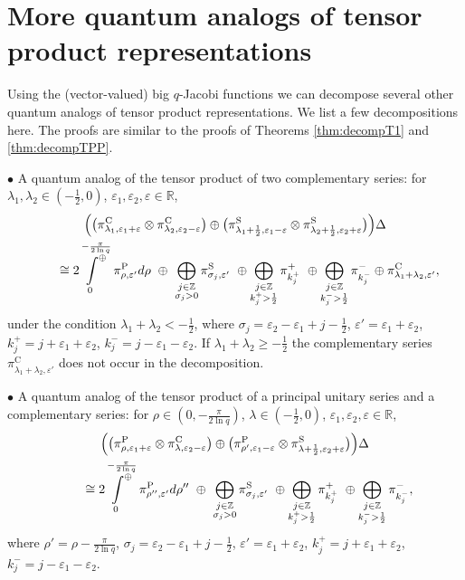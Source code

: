 \documentclass[pdftex]{sigma}
\numberwithin{equation}{section}
\numberwithin{theorem}{section}
\numberwithin{proposition}{section}
\numberwithin{lemma}{section}
\numberwithin{corollary}{section}
\numberwithin{definition}{section}
\numberwithin{example}{section}
\numberwithin{remark}{section}
\numberwithin{note}{section}
\newcommand{\R}{\mathbb R}
\newcommand{\Z}{\mathbb Z}
\newcommand{\eps}{\varepsilon}
\newcommand{\dirint}[2]{\sideset{}{^\oplus}\int\limits_{#1\ }^{\ \ #2}}
\begin{document}

\section{More quantum analogs of tensor product representations} \label{sec:more}
Using the (vector-valued) big $q$-Jacobi functions we can decompose several other quantum analogs of tensor product representations. We list a few decompositions here. The proofs are similar to the proofs of Theorems \ref{thm:decompT1} and \ref{thm:decompTPP}.


$\bullet$ A quantum analog of the tensor product of two complementary series:
for $\lambda_1,\lambda_2 \in (-\frac12,0)$, $\eps_1,\eps_2, \eps \in \R$,
\begin{gather*}
\Big(\big(\pi_{\lambda_1,\eps_1+\eps}^{\mathrm{C}}  \otimes \pi_{\lambda_2,\eps_2-\eps}^{\mathrm{C}}\big) \oplus \big(\pi_{\lambda_1+\frac12,\eps_1-\eps}^{\mathrm{S}} \otimes \pi_{\lambda_2+\frac12,\eps_2+\eps}^{\mathrm{S}}\big)\Big)\Delta
 \\
\qquad{} \cong 2\dirint{0}{-\frac{\pi}{2 \ln q}} \pi^{\mathrm P}_{\rho,\eps'} d\rho\ \oplus\ \bigoplus_{\substack{j\in\Z\\ \sigma_j>0}} \pi_{\sigma_j,\eps'}^{\mathrm S} \ \oplus \bigoplus_{\substack{j\in\Z \\ k_j^+>\frac12}} \pi_{k_j^+}^+ \ \oplus \bigoplus_{\substack{j\in\Z \\ k_j^->\frac12}} \pi_{k_j^-}^- \oplus \pi_{\lambda_1+\lambda_2,\eps'}^{\mathrm{C}},
\end{gather*}
under the condition $\lambda_1+\lambda_2<-\frac12$, where $\sigma_j=\eps_2-\eps_1+j-\frac12$, $\eps'=\eps_1+\eps_2$, $k_j^+=j+\eps_1+\eps_2$, $k_j^-=j-\eps_1-\eps_2$. If $\lambda_1+\lambda_2 \geq -\frac12$ the complementary series $\pi_{\lambda_1+\lambda_2,\eps'}^{\mathrm{C}}$ does not occur in the decomposition.

$\bullet$ A quantum analog of the tensor product of a principal unitary series and a complementary series:
for $\rho \in (0,-\frac{\pi}{2\ln q})$, $\lambda \in (-\frac12,0)$, $\eps_1,\eps_2,\eps \in \R$,
\begin{gather*}
\Big(\big(\pi_{\rho,\eps_1+\eps}^{\mathrm{P}}  \otimes \pi_{\lambda,\eps_2-\eps}^{\mathrm{C}}\big) \oplus \big(\pi_{\rho',\eps_1-\eps}^{\mathrm{P}} \otimes \pi_{\lambda+\frac12,\eps_2+\eps}^{\mathrm{S}}\big)\Big)\Delta
 \\
\qquad{} \cong 2\dirint{0}{-\frac{\pi}{2 \ln q}} \pi^{\mathrm P}_{\rho'',\eps'} d\rho''\ \oplus\ \bigoplus_{\substack{j\in\Z\\ \sigma_j>0}} \pi_{\sigma_j,\eps'}^{\mathrm S} \ \oplus \bigoplus_{\substack{j\in\Z \\ k_j^+>\frac12}} \pi_{k_j^+}^+ \ \oplus \bigoplus_{\substack{j\in\Z \\ k_j^->\frac12}} \pi_{k_j^-}^-,
\end{gather*}
where $\rho'=\rho-\frac{\pi}{2\ln q}$, $\sigma_j=\eps_2-\eps_1+j-\frac12$, $\eps'=\eps_1+\eps_2$, $k_j^+=j+\eps_1+\eps_2$, $k_j^-=j-\eps_1-\eps_2$.
\end{document}
